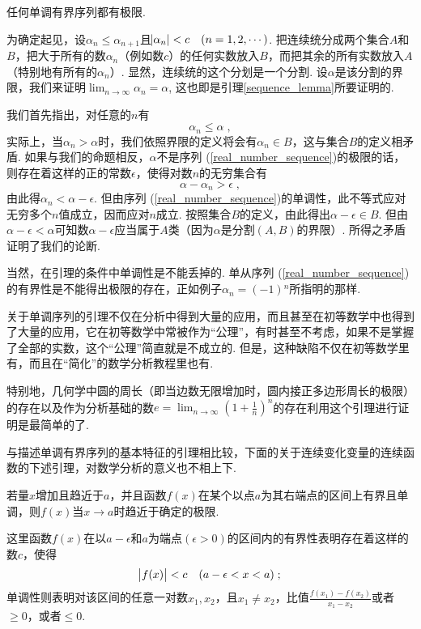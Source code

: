 \documentclass[color=cyan,mathpazo,titlestyle=hang]{elegantbook_mac}
\begin{document}
\begin{newlemma}
任何单调有界序列都有极限. 
\label{sequence_lemma}
\end{newlemma}

为确定起见，设$\alpha_n\leqslant \alpha_{n+1}$且$\abs{\alpha_n}<c\hspace{10pt}(n=1,2,\cdots)$. 把连续统分成两个集合$A$和$B$，把大于所有的数$\alpha_n$（例如数$c$）的任何实数放入$B$，而把其余的所有实数放入$A$（特别地有所有的$\alpha_n$）. 显然，连续统的这个分划是一个分割. 设$\alpha$是该分割的界限，我们来证明$\lim_{n \to \infty}\alpha_n=\alpha$, 这也即是引理\ref{sequence_lemma}所要证明的. 

我们首先指出，对任意的$n$有
$$\alpha_n\leqslant\alpha\; ,$$
实际上，当$\alpha_n>\alpha$时，我们依照界限的定义将会有$\alpha_n\in B$，这与集合$B$的定义相矛盾. 如果与我们的命题相反，$\alpha$不是序列 (\ref{real_number_sequence})的极限的话，则存在着这样的正的常数$\epsilon$，使得对数$n$的无穷集合有
$$\alpha-\alpha_n >\epsilon\; ,$$
由此得$\alpha_n<\alpha-\epsilon$. 但由序列 (\ref{real_number_sequence})的单调性，此不等式应对无穷多个$n$值成立，因而应对$n$成立. 按照集合$B$的定义，由此得出$\alpha-\epsilon\in B$. 但由$\alpha-\epsilon<\alpha$可知数$\alpha-\epsilon$应当属于$A$类（因为$\alpha$是分割$(A,B)$的界限）. 所得之矛盾证明了我们的论断. 

当然，在引理的条件中单调性是不能丢掉的. 单从序列 (\ref{real_number_sequence})的有界性是不能得出极限的存在，正如例子$\alpha_n=(-1){}^n$所指明的那样. 

关于单调序列的引理不仅在分析中得到大量的应用，而且甚至在初等数学中也得到了大量的应用，它在初等数学中常被作为``公理''，有时甚至不考虑，如果不是掌握了全部的实数，这个``公理''简直就是不成立的. 但是，这种缺陷不仅在初等数学里有，而且在``简化''的数学分析教程里也有. 

特别地，几何学中圆的周长（即当边数无限增加时，圆内接正多边形周长的极限）的存在以及作为分析基础的数$e=\lim_{n\to \infty}(1+\frac{1}{n})^n$的存在利用这个引理进行证明是最简单的了. 

与描述单调有界序列的基本特征的引理相比较，下面的关于连续变化变量的连续函数的下述引理，对数学分析的意义也不相上下. 

\begin{newlemma}\label{sequence_lemma_plus}
若量$x$增加且趋近于$a$，并且函数$f(x)$在某个以点$a$为其右端点的区间上有界且单调，则$f(x)$当$x\to a$时趋近于确定的极限. 
\end{newlemma}

这里函数$f(x)$在以$a-\epsilon$和$a$为端点$(\epsilon>0)$的区间内的有界性表明存在着这样的数$c$，使得
$$\abs{f(x)}<c\hspace{10pt} (a-\epsilon<x<a)\; ;$$
单调性则表明对该区间的任意一对数$x_1, x_2$，且$x_1\neq x_2$，比值$\frac{f(x_1)-f(x_2)}{x_1-x_2}$或者$\geqslant 0$，或者$\leqslant 0$. 
\end{document}
